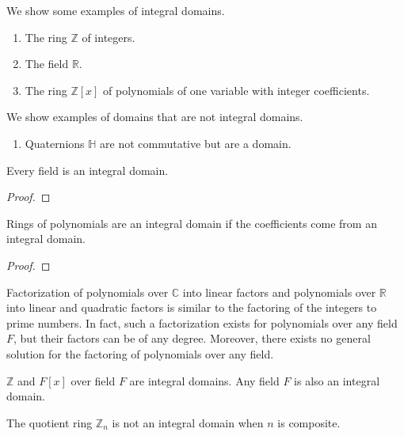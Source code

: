   \begin{example}
    We show some examples of integral domains. 
    \begin{enumerate}
      \item The ring $\mathbb{Z}$ of integers. 
      \item The field $\mathbb{R}$. 
      \item The ring $\mathbb{Z}[x]$ of polynomials of one variable with integer coefficients. 
    \end{enumerate}
    We show examples of domains that are not integral domains. 
    \begin{enumerate}
      \item Quaternions $\mathbb{H}$ are not commutative but are a domain. 
    \end{enumerate}
  \end{example} 

  \begin{theorem}
    Every field is an integral domain. 
  \end{theorem}
  \begin{proof}
    
  \end{proof}

  \begin{theorem}
    Rings of polynomials are an integral domain if the coefficients come from an integral domain. 
  \end{theorem}
  \begin{proof}
    
  \end{proof} 

  Factorization of polynomials over $\mathbb{C}$ into linear factors and polynomials over $\mathbb{R}$ into linear and quadratic factors is similar to the factoring of the integers to prime numbers. In fact, such a factorization exists for polynomials over any field $F$, but their factors can be of any degree. Moreover, there exists no general solution for the factoring of polynomials over any field. 

  \begin{example}
    $\mathbb{Z}$ and $F[x]$ over field $F$ are integral domains. Any field $F$ is also an integral domain. 
  \end{example}

  \begin{example}
    The quotient ring $\mathbb{Z}_n$ is not an integral domain when $n$ is composite. 
  \end{example}

